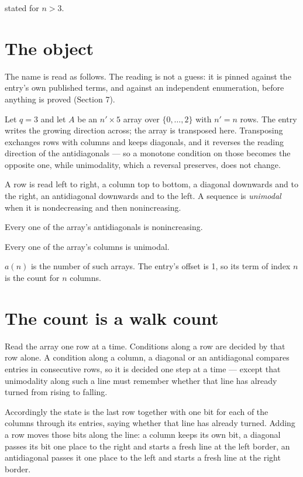 \documentclass[11pt]{article}
\theoremstyle{definition}
\begin{document}
stated for $n > 3$.

\section{The object}

The name is read as follows. The reading is not a guess: it is pinned against the entry's own published terms, and against an independent enumeration, before anything is proved (Section 7).

Let $q = 3$ and let $A$ be an $n' \times 5$ array over $\{0,\dots,2\}$ with $n' = n$ rows. The entry writes the growing direction across; the array is transposed here. Transposing exchanges rows with columns and keeps diagonals, and it reverses the reading direction of the antidiagonals --- so a monotone condition on those becomes the opposite one, while unimodality, which a reversal preserves, does not change.

A row is read left to right, a column top to bottom, a diagonal downwards and to the right, an antidiagonal downwards and to the left. A sequence is {\itshape unimodal} when it is nondecreasing and then nonincreasing.

Every one of the array's antidiagonals is nonincreasing.

Every one of the array's columns is unimodal.

$a(n)$ is the number of such arrays. The entry's offset is 1, so its term of index $n$ is the count for $n$ columns.

\section{The count is a walk count}

Read the array one row at a time. Conditions along a row are decided by that row alone. A condition along a column, a diagonal or an antidiagonal compares entries in consecutive rows, so it is decided one step at a time --- except that unimodality along such a line must remember whether that line has already turned from rising to falling.

Accordingly the state is the last row together with one bit for each of the columns through its entries, saying whether that line has already turned. Adding a row moves those bits along the line: a column keeps its own bit, a diagonal passes its bit one place to the right and starts a fresh line at the left border, an antidiagonal passes it one place to the left and starts a fresh line at the right border.
\end{document}
